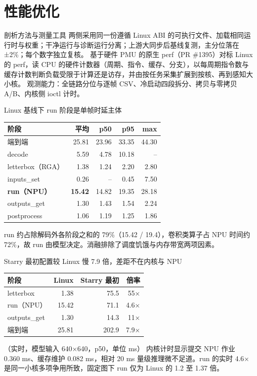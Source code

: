 \documentclass[aspectratio=169,fontset=mac]{ctexbeamer}
\newcommand{\hdr}[1]{\textsf{\bfseries\color{ink}#1}}
\newcommand{\headrow}{\rowcolor{tinthdr}}
\newcommand{\keyline}[1]{\par\vskip3pt\noindent\colorbox{tintbox}{\parbox{0.91\textwidth}{\color{ink}#1}}\par}
\begin{document}
%
\section{性能优化}

\begin{frame}{剖析方法与测量工具}
\small
两侧采用同一份遵循 Linux ABI 的可执行文件、加载相同运行时与权重；干净运行与诊断运行分离；上游大同步后基线复测，主分位落在 ±2\%；每个数字独立复核。
\vskip5pt
基于硬件 PMU 的原生 perf（PR \#1395）对标 Linux 的 perf，读 CPU 的硬件计数器（周期、指令、缓存、分支），以每周期指令数与缓存计数判断负载受限于计算还是访存，并由按任务采集扩展到按核、再到感知大小核。
\vskip5pt
\footnotesize 观测能力：全链路分位与逐帧 CSV、冷启动四段拆分、拷贝与零拷贝 A/B、内核侧 ioctl 计时。
\end{frame}

\begin{frame}{Linux 基线下 run 阶段是单帧时延主体}
\small
\begin{tabular}{@{}l*{4}{r}@{}}
\toprule
\headrow \hdr{阶段} & \hdr{平均} & \hdr{p50} & \hdr{p95} & \hdr{max}\\
\midrule
端到端 & 25.81 & 23.96 & 33.35 & 44.30\\
decode & 5.59 & 4.78 & 10.18 & --\\
letterbox（RGA）& 1.38 & 1.24 & 2.20 & 2.80\\
inputs\_set & 0.26 & -- & 0.45 & 7.50\\
\textbf{run（NPU）} & \textbf{15.42} & 14.82 & 19.35 & 28.18\\
outputs\_get & 1.30 & 1.43 & 1.54 & 2.24\\
postprocess & 1.06 & 1.19 & 1.25 & 1.86\\
\bottomrule
\end{tabular}
\keyline{run 约占除解码外各阶段之和的 79\%（15.42 / 19.4），卷积类算子占 NPU 时间约 72\%，故 run 由模型决定。消融排除了调度饥饿与内存带宽两项因素。}
\end{frame}

\begin{frame}{Starry 最初配置较 Linux 慢 7.9 倍，差距不在内核与 NPU}
\small
\begin{tabular}{@{}lrrr@{}}
\toprule
\headrow \hdr{阶段} & \hdr{Linux} & \hdr{Starry 最初} & \hdr{倍率}\\
\midrule
letterbox & 1.38 & 75.5 & 55×\\
run（NPU）& 15.42 & 71.1 & 4.6×\\
outputs\_get & 1.30 & 14.3 & 11×\\
端到端 & 25.81 & 202.9 & 7.9×\\
\bottomrule
\end{tabular}
\hfill（实时，模型输入 640×640，p50，单位 ms）
\vskip5pt
\small 内核计时显示提交 NPU 作业 0.360 ms、缓存维护 0.082 ms，相对 20 ms 量级推理微不足道。run 的实时 4.6× 是同一小核多项争用所致，固定图下 run 仅为 Linux 的 1.2 至 1.37 倍。
\end{frame}
\end{document}
